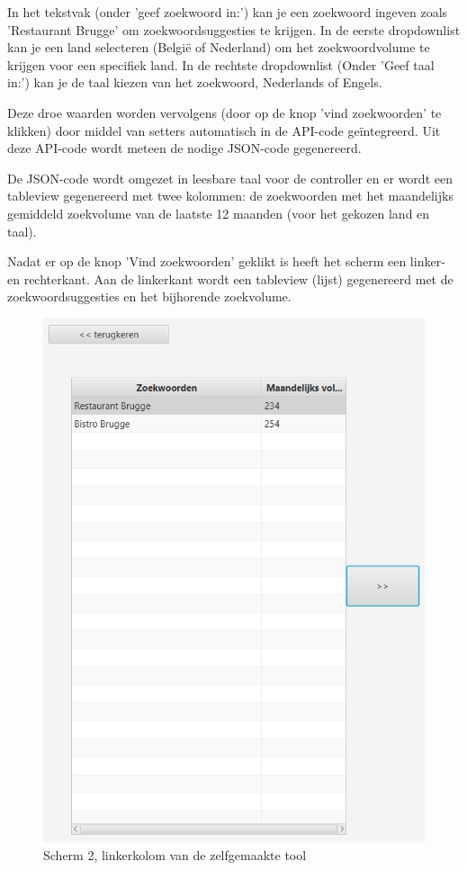 In het tekstvak (onder 'geef zoekwoord in:') kan je een zoekwoord ingeven zoals 'Restaurant Brugge' om zoekwoordsuggesties te krijgen. In de eerste dropdownlist kan je een land selecteren (België of Nederland) om het zoekwoordvolume te krijgen voor een specifiek land. In de rechtste dropdownlist (Onder 'Geef taal in:') kan je de taal kiezen van het zoekwoord, Nederlands of Engels. 

Deze droe waarden worden vervolgens (door op de knop 'vind zoekwoorden' te klikken) door middel van setters automatisch in de API-code geïntegreerd. Uit deze API-code wordt meteen de nodige JSON-code gegenereerd. 

De JSON-code wordt omgezet in leesbare taal voor de controller en er wordt een tableview gegenereerd met twee kolommen: de zoekwoorden met het maandelijks gemiddeld zoekvolume van de laatste 12 maanden (voor het gekozen land en taal). 

Nadat er op de knop 'Vind zoekwoorden' geklikt is heeft het scherm een linker- en rechterkant. Aan de linkerkant wordt een tableview (lijst) gegenereerd met de zoekwoordsuggesties en het bijhorende zoekvolume. 

\begin{figure}[h!]
\centering
\includegraphics[width=\linewidth]{img/scherm2linkerkant.PNG}
\caption{Scherm 2, linkerkolom van de zelfgemaakte tool}
\end{figure}

